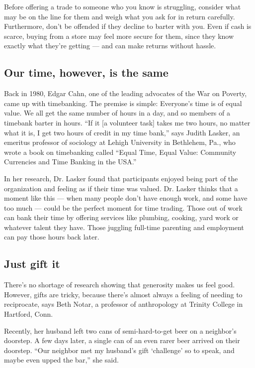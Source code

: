 Before offering a trade to someone who you know is struggling, consider
what may be on the line for them and weigh what you ask for in return
carefully. Furthermore, don't be offended if they decline to barter with
you. Even if cash is scarce, buying from a store may feel more secure
for them, since they know exactly what they're getting --- and can make
returns without hassle.

\hypertarget{our-time-however-is-the-same}{%
\subsection{Our time, however, is the
same}\label{our-time-however-is-the-same}}

Back in 1980, Edgar Cahn, one of the leading advocates of the War on
Poverty, came up with timebanking. The premise is simple: Everyone's
time is of equal value. We all get the same number of hours in a day,
and so members of a timebank barter in hours. ``If it {[}a volunteer
task{]} takes me two hours, no matter what it is, I get two hours of
credit in my time bank,'' says Judith Lasker, an emeritus professor of
sociology at Lehigh University in Bethlehem, Pa., who wrote a book on
timebanking called ``Equal Time, Equal Value: Community Currencies and
Time Banking in the USA.''

In her research, Dr. Lasker found that participants enjoyed being part
of the organization and feeling as if their time was valued. Dr. Lasker
thinks that a moment like this --- when many people don't have enough
work, and some have too much --- could be the perfect moment for time
trading. Those out of work can bank their time by offering services like
plumbing, cooking, yard work or whatever talent they have. Those
juggling full-time parenting and employment can pay those hours back
later.

\hypertarget{just-gift-it}{%
\subsection{Just gift it}\label{just-gift-it}}

There's no shortage of research showing that generosity makes us feel
good. However, gifts are tricky, because there's almost always a feeling
of needing to reciprocate, says Beth Notar, a professor of anthropology
at Trinity College in Hartford, Conn.

Recently, her husband left two cans of semi-hard-to-get beer on a
neighbor's doorstep. A few days later, a single can of an even rarer
beer arrived on their doorstep. ``Our neighbor met my husband's gift
`challenge' so to speak, and maybe even upped the bar,'' she said.

